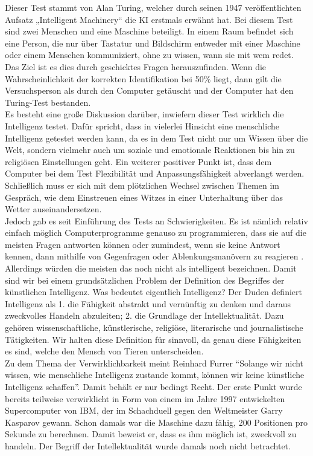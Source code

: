 Dieser Test stammt von Alan Turing, welcher durch seinen 1947 veröffentlichten Aufsatz „Intelligent Machinery“ die KI erstmals erwähnt hat. Bei diesem Test sind zwei Menschen und eine Maschine beteiligt. In einem Raum befindet sich eine Person, die nur über Tastatur und Bildschirm entweder mit einer Maschine oder einem Menschen kommuniziert, ohne zu wissen, wann sie mit wem redet. Das Ziel ist es dies durch geschicktes Fragen herauszufinden. Wenn die Wahrscheinlichkeit der korrekten Identifikation bei 50\% liegt, dann gilt die Versuchsperson als durch den Computer getäuscht und der Computer hat den Turing-Test bestanden.  \\
%

Es besteht eine große Diskussion darüber, inwiefern dieser Test wirklich die Intelligenz testet. Dafür spricht, dass in vielerlei Hinsicht eine menschliche Intelligenz getestet werden kann, da es in dem Test nicht nur um Wissen über die Welt, sondern vielmehr auch um soziale und emotionale Reaktionen bis hin zu religiösen Einstellungen geht. Ein weiterer positiver Punkt ist, dass dem Computer bei dem Test Flexibilität und Anpassungsfähigkeit abverlangt werden. Schließlich muss er sich mit dem plötzlichen Wechsel zwischen Themen im Gespräch, wie dem Einstreuen eines Witzes in einer Unterhaltung über das Wetter auseinandersetzen. \\
%

Jedoch gab es seit Einführung des Tests an Schwierigkeiten. Es ist nämlich relativ einfach möglich Computerprogramme genauso zu programmieren, dass sie auf die meisten Fragen antworten können oder zumindest, wenn sie keine Antwort kennen,  dann mithilfe von Gegenfragen oder Ablenkungsmanövern zu reagieren \cite{NewAtlantis}.  Allerdings würden die meisten das noch nicht als intelligent bezeichnen.
Damit sind wir bei einem grundsätzlichen Problem der Definition des Begriffes der künstlichen Intelligenz. Was bedeutet eigentlich Intelligenz? 
Der Duden definiert Intelligenz als
1. die Fähigkeit abstrakt und vernünftig zu denken und daraus zweckvolles Handeln abzuleiten;
2. die Grundlage der Intellektualität. Dazu gehören wissenschaftliche, künstlerische, religiöse, literarische und journalistische Tätigkeiten. 
Wir halten diese Definition für sinnvoll, da genau diese Fähigkeiten es sind, welche den Mensch von Tieren unterscheiden.\\
%

Zu dem Thema der Verwirklichbarkeit meint Reinhard Furrer  \enquote{Solange wir nicht wissen, wie menschliche Intelligenz zustande kommt, können wir keine künstliche Intelligenz schaffen}. Damit behält er nur bedingt Recht. Der erste Punkt wurde bereits teilweise verwirklicht in Form von einem im Jahre 1997 entwickelten Supercomputer von IBM, der im Schachduell gegen den Weltmeister Garry Kasparov gewann. Schon damals war die Maschine dazu fähig, 200 Positionen pro Sekunde zu berechnen. Damit beweist er, dass es ihm möglich ist, zweckvoll zu handeln. Der Begriff der Intellektualität wurde damals noch nicht betrachtet. \\
%

